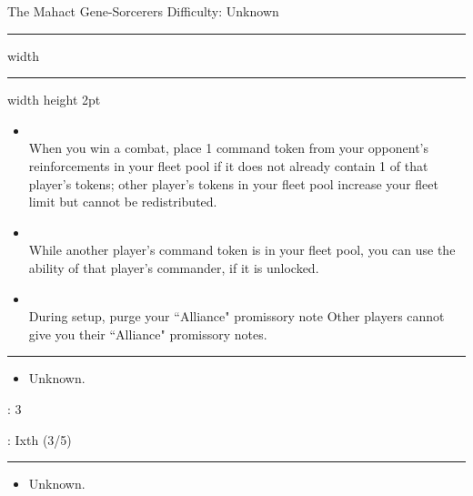 \newpage
{\handel\Huge The Mahact Gene-Sorcerers} \hfill {\Large Difficulty: Unknown} \vspace{-4pt}\\
\hrule width \hsize \kern 1mm \hrule width \hsize height 2pt


\begin{multicols}{2}


\begin{itemize}
\item {}\\
When you win a combat, place 1 command token from your opponent's reinforcements in your fleet pool if it does not already contain 1 of that player's tokens; other player's tokens in your fleet pool increase your fleet limit but cannot be redistributed.
\item {}\\
While another player's command token is in your fleet pool, you can use the ability of that player's commander, if it is unlocked.
\item {}\\
During setup, purge your ``Alliance" promissory note Other players cannot give you their ``Alliance" promissory notes.
\end{itemize}


\vspace{-10pt}\rule{\hsize}{0.4pt}\vspace{5pt}


\vspace{-5pt}
\begin{multicols}{2}
\begin{itemize}
\item Unknown.
\end{itemize}
\end{multicols}

\vspace{-5pt}
: 3

\vspace{2pt}
: Ixth (3/5)

\rule{\hsize}{0.4pt}\vspace{5pt}


\begin{itemize}
\item Unknown.
\end{itemize}


\end{multicols}
